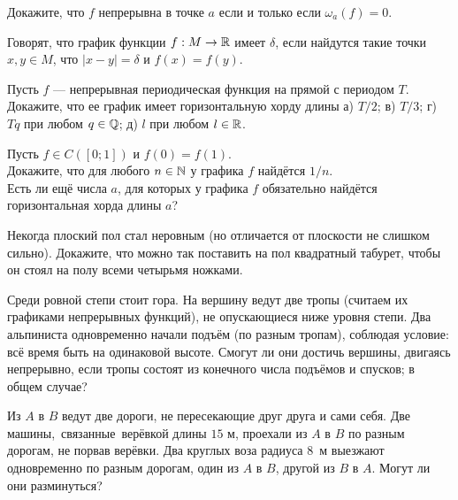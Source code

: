 \documentclass[a4paper,12pt]{article}
\begin{document}
Докажите, что $f$ непрерывна
в точке $a$ %
если и только если $\omega_a(f)=0$.

Говорят, что
график функции $f:M\rightarrow\mathbb{R}$ имеет  $\delta$,
если найдутся такие точки $x,y\in M$, что $|x-y|=\delta$ и
$f(x)=f(y).$

Пусть $f$ --- непрерывная периодическая функция на прямой с периодом $T$. Докажите, что ее график имеет горизонтальную хорду длины %
а) $T/2$;
в) $T/3$;
г) $Tq$ при любом $q\in\mathbb{Q}$;
д) $l$ при любом $l\in\mathbb{R}$.

Пусть $f\in C([0;1])$ и $f(0)=f(1)$.\\
Докажите, что для любого $n\in\mathbb{N}$ у графика $f$ найд\"ется
 $1/n$.\\
Есть ли ещ\"е  числа $a$, для которых у графика $f$ обязательно найд\"ется
горизонтальная хорда длины $a$?




Некогда плоский пол стал неровным (но отличается от плоскости не слишком сильно).
Докажите, что можно так поставить на пол %
квадратный табурет, чтобы он стоял на полу всеми четырьмя ножками.

Среди ровной степи стоит гора. На вершину ведут две тропы
(считаем их графиками непрерывных функций),
не опускающиеся ниже уровня степи.
Два альпиниста одновременно начали подъ\"ем (по разным тропам),
соблюдая условие:
вс\"е время быть на одинаковой высоте.
Смогут ли они %
достичь вершины, двигаясь непрерывно, если
тропы состоят из конечного числа подъ\"емов и спусков;
 в общем случае?



Из $A$ в $B$ ведут две дороги,
не пересекающие друг друга и сами себя.
Две машины,~\hbox{связанные}~ве\-р\"ев\-кой длины $15$ м,
проехали из $A$ в $B$ по разным дорогам,
не порвав вер\"евки.
Два круглых воза радиуса $8$~м
выезжают одновременно по разным дорогам, один из $A$ в $B$,
другой из $B$ в $A$. %
Могут ли они разминуться?



\end{document}
